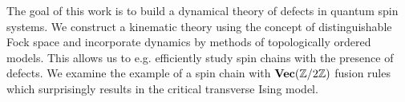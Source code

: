 The goal of this work is to build a dynamical theory of defects in quantum spin systems. We construct a kinematic theory using the concept of distinguishable Fock space and incorporate dynamics by methods of topologically ordered models. This allows us to e.g. efficiently study spin chains with the presence of defects. We examine the example of a spin chain with $\textbf{Vec}(\mathbb{Z}/2\mathbb{Z})$ fusion rules which surprisingly results in the critical transverse Ising model.